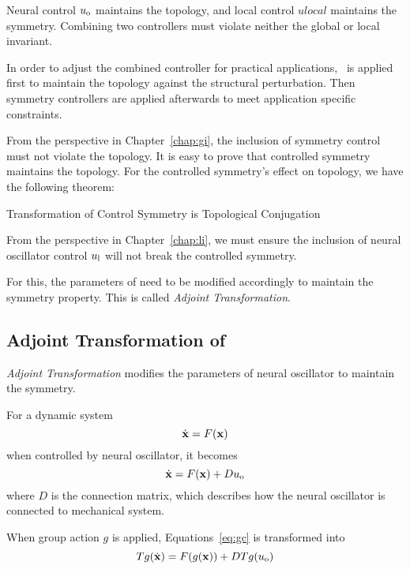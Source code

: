 Neural control $u_{\mathrm{o}}$ maintains the topology, and local control $ulocal$  maintains the symmetry.
Combining two controllers must  violate neither the global or local invariant.

In order to adjust the combined controller for practical applications,
\cpg\ is applied first to maintain the topology against the structural perturbation. 
Then symmetry controllers are applied afterwards to meet application specific constraints.






From the perspective in Chapter~\ref{chap:gi}, the inclusion of symmetry control must not violate the topology. 
It is easy to prove that controlled symmetry maintains the topology.
For the controlled symmetry's effect on topology, we have the following theorem:

\begin{mythe}
Transformation of Control Symmetry is Topological Conjugation
\end{mythe}


From the perspective in Chapter~\ref{chap:li},
we must ensure the inclusion of neural oscillator control $u_{\mathrm{l}}$ will not break the controlled symmetry.


For this, the parameters of \cpg need to be modified accordingly to maintain the symmetry property.
This is called \emph{Adjoint Transformation}.









\subsection{Adjoint Transformation of \cpg}
\emph{Adjoint Transformation} modifies the parameters of neural oscillator to maintain the symmetry.

For a dynamic system 
\[
\dot{\mathbf{x}}=F(\mathbf{x})
\]
when controlled by neural oscillator, it becomes 
\begin{equation}
\label{eq:gc}
\dot{\mathbf{x}}=F(\mathbf{x})+Du_{\mathrm{o}}
\end{equation}
where $D$ is the connection matrix, which describes how the neural oscillator is connected to mechanical system.


When group action $g$ is applied, Equations~\ref{eq:gc} is transformed into
\begin{equation}
\label{eq:cc}
Tg(\dot{\mathbf{x}})=F(g(\mathbf{x}))+DTg(u_{\mathrm{o}})
\end{equation}




